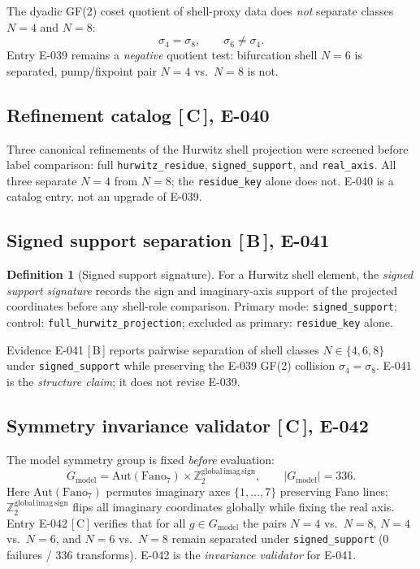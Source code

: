 \documentclass[11pt, lettersize, article]{article}
\theoremstyle{definition}
\newtheorem{definition}[theorem]{Definition}
\theoremstyle{remark}
\newcommand{\evidence}[1]{\textnormal{[\,#1\,]}}
\begin{document}
The dyadic GF(2) coset quotient of shell-proxy data does \emph{not} separate classes $N=4$ and $N=8$:
\[
  \sigma_4 = \sigma_8,
  \qquad
  \sigma_6 \neq \sigma_4.
\]
Entry E-039 remains a \emph{negative} quotient test: bifurcation shell $N=6$ is separated, pump/fixpoint pair $N=4$ vs.\ $N=8$ is not.

\subsection{Refinement catalog \evidence{C}, E-040}

Three canonical refinements of the Hurwitz shell projection were screened before label comparison: full \texttt{hurwitz\_residue}, \texttt{signed\_support}, and \texttt{real\_axis}.
All three separate $N=4$ from $N=8$; the \texttt{residue\_key} alone does not.
E-040 is a catalog entry, not an upgrade of E-039.

\subsection{Signed support separation \evidence{B}, E-041}

\begin{definition}[Signed support signature]
\label{def:signed-support}
For a Hurwitz shell element, the \emph{signed support signature} records the sign and imaginary-axis support of the projected coordinates before any shell-role comparison.
Primary mode: \texttt{signed\_support}; control: \texttt{full\_hurwitz\_projection}; excluded as primary: \texttt{residue\_key} alone.
\end{definition}

Evidence E-041 \evidence{B} reports pairwise separation of shell classes $N\in\{4,6,8\}$ under \texttt{signed\_support} while preserving the E-039 GF(2) collision $\sigma_4=\sigma_8$.
E-041 is the \emph{structure claim}; it does not revise E-039.

\subsection{Symmetry invariance validator \evidence{C}, E-042}

The model symmetry group is fixed \emph{before} evaluation:
\[
  G_{\mathrm{model}}
  =
  \mathrm{Aut}(\mathrm{Fano}_7)
  \times
  \mathbb{Z}_2^{\mathrm{global\,imag\,sign}},
  \qquad
  |G_{\mathrm{model}}| = 336.
\]
Here $\mathrm{Aut}(\mathrm{Fano}_7)$ permutes imaginary axes $\{1,\ldots,7\}$ preserving Fano lines; $\mathbb{Z}_2^{\mathrm{global\,imag\,sign}}$ flips all imaginary coordinates globally while fixing the real axis.
Entry E-042 \evidence{C} verifies that for all $g\in G_{\mathrm{model}}$ the pairs $N=4$ vs.\ $N=8$, $N=4$ vs.\ $N=6$, and $N=6$ vs.\ $N=8$ remain separated under \texttt{signed\_support} (0 failures / 336 transforms).
E-042 is the \emph{invariance validator} for E-041.
\end{document}
